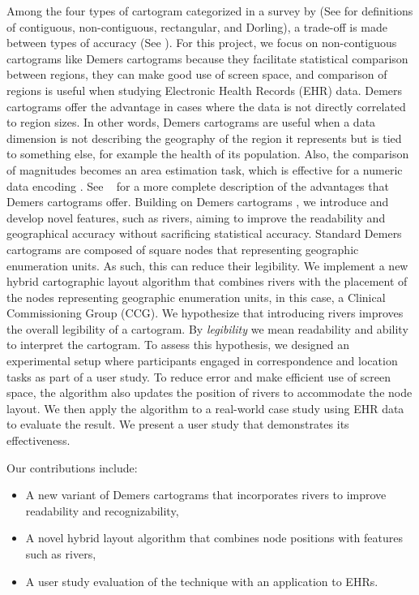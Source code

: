 \documentclass[Afour,sagev,times]{sagej}
\newcommand{\citea}[1]{\citeauthor{#1}~\cite{#1}}
\begin{document}
Among the four types of cartogram categorized in a survey by \citet{nusrat2016State} (See  for definitions of contiguous, non-contiguous, rectangular, and Dorling), a trade-off is made between types of accuracy (See ).
For this project, we focus on non-contiguous cartograms like Demers cartograms because they facilitate statistical comparison between regions, they can make good use of screen space, and comparison of regions is useful when studying Electronic Health Records (EHR) data.
Demers cartograms offer the advantage in cases where the data is not directly correlated to region sizes.
In other words, Demers cartograms are useful when a data dimension is not describing the geography of the region it represents but is tied to something else, for example the health of its population.
Also, the comparison of magnitudes becomes an area estimation task, which is effective for a numeric data encoding \cite{munzner2014Visualization}.
See \citea{nickel2022Multicriteria} for a more complete description of the advantages that Demers cartograms offer.
Building on Demers cartograms \cite{ian2002Cartogram}, we introduce and develop novel features, such as rivers, aiming to improve the readability and geographical accuracy without sacrificing statistical accuracy.
Standard Demers cartograms are composed of square nodes that representing geographic enumeration units.
As such, this can reduce their legibility.
We implement a new hybrid cartographic layout algorithm that combines rivers with the placement of the nodes representing geographic enumeration units, in this case, a Clinical Commissioning Group (CCG).
We hypothesize that introducing rivers improves the overall legibility of a cartogram.
By \textit{legibility} we mean readability and ability to interpret the cartogram.
To assess this hypothesis, we designed an experimental setup where participants engaged in correspondence and location tasks as part of a user study.
To reduce error and make efficient use of screen space, the algorithm also updates the position of rivers to accommodate the node layout.
We then apply the algorithm to a real-world case study using EHR data to evaluate the result.
We present a user study that demonstrates its effectiveness.

Our contributions include:

\begin{itemize}
    \setlength\itemsep{0px}
    \item A new variant of Demers cartograms that incorporates rivers to improve readability and recognizability,
    \item A novel hybrid layout algorithm that combines node positions with features such as rivers,
    \item A user study evaluation of the technique with an application to EHRs.
\end{itemize}
\end{document}
